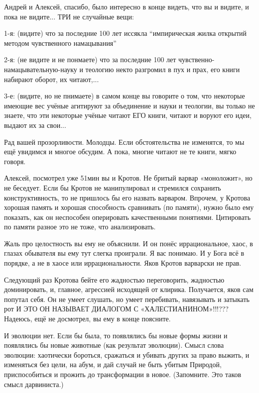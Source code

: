 \begin{multicols}{2}

Андрей и Алексей, спасибо, было интересно в конце видеть, что вы и видите, и
пока не видите... ТРИ не случайные вещи:

1-я: (видите) что за последние 100 лет иссякла \enquote{импирическая жилка открытий
методом чувственного намацывания} 

2-я: (не видите и не понмаете) что за последние 100 лет
чувственно-намацывательную-науку и теологию некто разгромил в пух и прах, его
книги набирают оборот, их читают,...

3-е: (видите, но не пнимаете) в самом конце вы говорите о том, что некоторые
имеющие вес учёные агитируют за объединение и науки и теологии, вы только не
знаете, что эти некоторые учёные читают ЕГО книги, читают и воруют его идеи,
выдают их за свои... 

Рад вашей прозорливости. Молодцы. Если обстоятельства не изменятся, то мы ещё
увидимся и многое обсудим. А пока, многие читают не те книги, мягко говоря.


Алексей, посмотрел уже 51мин вы и Кротов. Не бритый варвар «моноложит», но не
беседует. Если бы Кротов не манипулировал и стремился сохранить
конструктивность, то не пришлось бы его назвать варваром. Впрочем, у Кротова
хорошая память и хорошая способность сравнивать (по памяти), нужно было ему
показать, как он неспособен оперировать качественными понятиями. Цитировать по
памяти разное это не тоже, что анализировать. 

Жаль про целостность вы ему не объяснили. И он понёс иррациональное, хаос, в
глазах обывателя вы ему тут слегка проиграли. Я вас понимаю. И у Бога всё в
порядке, а не в хаосе или иррациональности. Яков Кротов варварски не прав.

Следующий раз Кротова бейте его жадностью переговорить, жадностью доминировать,
и, главное, агрессией исходящей от клирика. Получается, яков сам попутал себя.
Он не умеет слушать, но умеет перебивать, навязывать и затыкать рот И ЭТО ОН
НАЗЫВАЕТ ДИАЛОГОМ С «ХАЛЕСТИАНИНОМ»!!!??? Надеюсь, ещё не досмотрел, вы ему в
конце поясните.

И эволюции нет. Если бы была, то появлялись бы новые формы жизни и появлялись
бы новые животные (как результат эволюции). Смысл слова эволюции: хаотически
бороться, сражаться и убивать других за право выжить, и изменяться без цели, на
абум, и дай случай не быть убитым Природой, приспособиться и прожить до
трансформации в новое. (Запомните. Это таков смысл дарвиниста.) 


\end{multicols}
